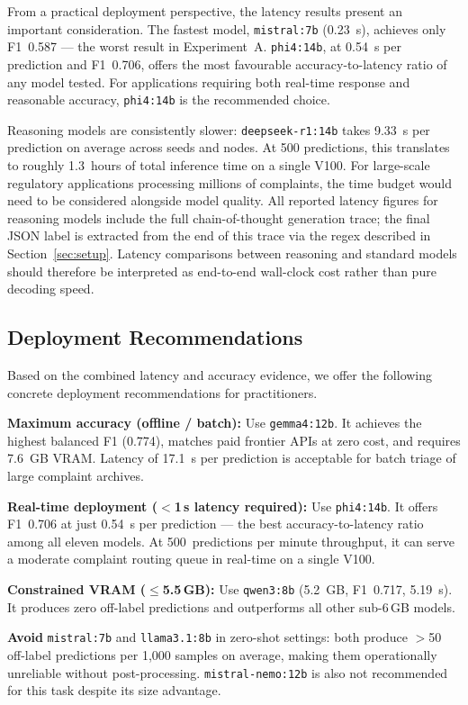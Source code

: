 \documentclass[journal]{IEEEtran}
\begin{document}
From a practical deployment perspective, the latency results present
an important consideration. The fastest model, \texttt{mistral:7b}
(0.23~s), achieves only F1~0.587 — the worst result in Experiment~A.
\texttt{phi4:14b}, at 0.54~s per prediction and F1~0.706, offers
the most favourable accuracy-to-latency ratio of any model tested.
For applications requiring both real-time response and reasonable
accuracy, \texttt{phi4:14b} is the recommended choice.

Reasoning models are consistently slower: \texttt{deepseek-r1:14b}
takes 9.33~s per prediction on average across seeds and nodes.
At 500 predictions, this translates to roughly 1.3~hours of total
inference time on a single V100. For
large-scale regulatory applications processing millions of complaints,
the time budget would need to be considered alongside model quality.
All reported latency figures for reasoning models include the full
chain-of-thought generation trace; the final JSON label is extracted
from the end of this trace via the regex described in
Section~\ref{sec:setup}. Latency comparisons between reasoning and
standard models should therefore be interpreted as end-to-end
wall-clock cost rather than pure decoding speed.

\subsection{Deployment Recommendations}

Based on the combined latency and accuracy evidence, we offer the
following concrete deployment recommendations for practitioners.

\textbf{Maximum accuracy (offline / batch):}
Use \texttt{gemma4:12b}. It achieves the highest balanced F1 (0.774),
matches paid frontier APIs at zero cost, and requires 7.6~GB VRAM.
Latency of 17.1~s per prediction is acceptable for batch triage of
large complaint archives.

\textbf{Real-time deployment ($<$1\,s latency required):}
Use \texttt{phi4:14b}. It offers F1~0.706 at just 0.54~s per
prediction — the best accuracy-to-latency ratio among all eleven models.
At 500~predictions per minute throughput, it can serve a moderate
complaint routing queue in real-time on a single V100.

\textbf{Constrained VRAM ($\leq$5.5\,GB):}
Use \texttt{qwen3:8b} (5.2~GB, F1~0.717, 5.19~s). It produces zero
off-label predictions and outperforms all other sub-6\,GB models.

\textbf{Avoid} \texttt{mistral:7b} and \texttt{llama3.1:8b} in
zero-shot settings: both produce $>$50 off-label predictions per
1,000 samples on average, making them operationally unreliable
without post-processing.
\texttt{mistral-nemo:12b} is also not recommended for this task
despite its size advantage.
\end{document}
